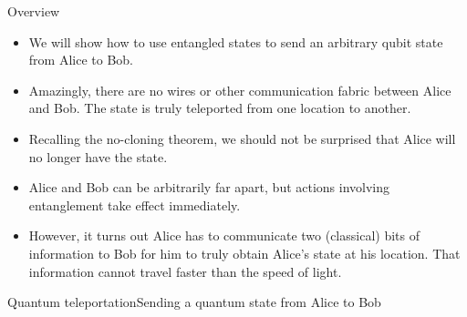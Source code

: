 
\begin{frame}{Overview}
    \begin{itemize}[<+->]
        \item We will show how to use entangled states to send an arbitrary qubit state from Alice to Bob.
        \item Amazingly, there are no wires or other communication fabric between Alice and Bob.  The state is truly teleported from one location to another.
        \item Recalling the no-cloning theorem, we should not be surprised that Alice will no longer have the state.
        \item Alice and Bob can be arbitrarily far apart, but actions involving entanglement take effect immediately.
        \item However, it turns out Alice has to communicate two (classical) bits of information to Bob for him to truly obtain Alice's state at his location.  That information cannot travel faster than the speed of light.
    \end{itemize}
\end{frame}

\begin{frame}{Quantum teleportation}{Sending a quantum state from Alice to Bob}

\end{frame}